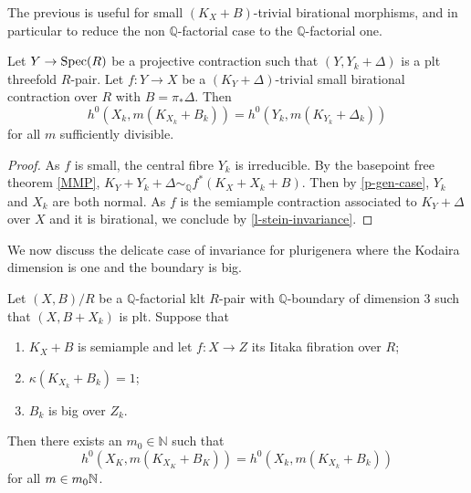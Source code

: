 	The previous is useful for small $(K_{X}+B)$-trivial birational morphisms, and in particular to reduce the non $\mathbb{Q}$-factorial case to the $\mathbb{Q}$-factorial one.
	
	
	\begin{lemma}\label{l-reduce-Q-fac}
		Let $Y \to \operatorname{Spec}(R)$ be a projective contraction such that $(Y,Y_{k}+\Delta)$ is a plt threefold $R$-pair.
		Let $f \colon Y \to X$ be a $(K_{Y}+\Delta)$-trivial small birational contraction over $R$ with $B=\pi_{*}\Delta$. 
		Then
		$$h^{0}(X_{k},m(K_{X_k}+B_{k}))= h^{0}(Y_{k},m(K_{Y_{k}}+\Delta_{k}))$$ 
		for all $m$ sufficiently divisible. 
	\end{lemma}

	\begin{proof}
	
	As $f$ is small, the central fibre $Y_k$ is irreducible. 
	By the basepoint free theorem \autoref{MMP},	$K_Y+Y_k+\Delta \sim_{\mathbb{Q}} f^*(K_X+X_k+B)$.
	Then by \autoref{p-gen-case}, $Y_k$ and $X_k$ are both normal.
	As $f$ is the semiample contraction associated to $K_Y+\Delta$ over $X$ and it is birational, we conclude by \autoref{l-stein-invariance}.
	\end{proof}

	We now discuss the delicate case of invariance for plurigenera where the Kodaira dimension is one and the boundary is big.
	
	
	\begin{proposition}\label{p-1-case}
		
		Let $(X,B)/R$ be a $\mathbb{Q}$-factorial klt $R$-pair with $\mathbb{Q}$-boundary of dimension $3$ such that $(X,B+X_{k})$ is plt. Suppose that
		\begin{enumerate}
			\item $K_X+B$ is semiample and let $f\colon X \to Z$ its Iitaka fibration over $R$;
			\item $\kappa(K_{X_{k}}+B_{k})=1$;
			\item $B_{k}$ is big over $Z_{k}$.
		\end{enumerate}
		Then there exists an $m_{0} \in \mathbb{N}$  such that 
		$$h^0(X_K,m(K_{X_K}+B_K))=h^0(X_k,m(K_{X_k}+B_k))$$
		for all $m\in m_0\mathbb{N}$.	
	\end{proposition}
	

